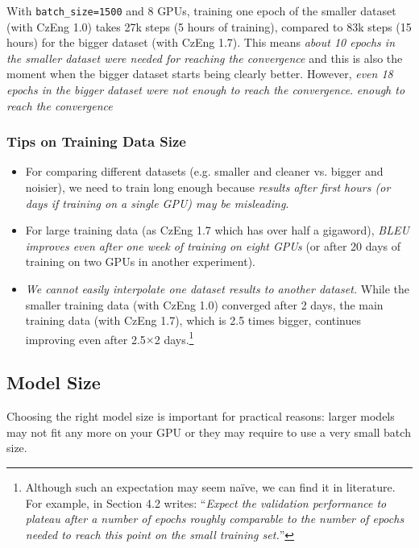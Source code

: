 \documentclass{pbmlarxiv} \pdfoutput=1
\def\recommend#1{\textsl{#1}}
\begin{document}
With \verb|batch_size=1500| and 8 GPUs,
 training one epoch of the smaller dataset (with CzEng 1.0) takes 27k steps (5 hours of training),
 compared to 83k steps (15 hours) for the bigger dataset (with CzEng 1.7).
This means \recommend{about 10 epochs in the smaller dataset were needed for reaching the convergence}
 and this is also the moment when the bigger dataset starts being clearly better.
However, \recommend{even 18 epochs in the bigger dataset were not enough to reach the convergence}.
\textit{enough to reach the convergence}

\subsubsection*{Tips on Training Data Size}
\begin{itemize}
  \item For comparing different datasets (e.g. smaller and cleaner vs. bigger and noisier),
    we need to train long enough because
    \recommend{results after first hours (or days if training on a single GPU) may be misleading}.
  \item For large training data (as CzEng 1.7 which has over half a gigaword),
   \recommend{BLEU improves even after one week of training on eight GPUs}
    (or after 20 days of training on two GPUs in another experiment).
  \item \recommend{We cannot easily interpolate one dataset results to another dataset.}
   While the smaller training data (with CzEng 1.0) converged after 2 days,
    the main training data (with CzEng 1.7), which is 2.5 times bigger,
    continues improving even after 2.5$\times$2 days.\footnote{
     Although such an expectation may seem na\"ive, we can find it in literature.
     For example, \citet{bottou-2012} in Section 4.2 writes:
     ``\emph{Expect the validation performance to plateau after a number of epochs roughly comparable
     to the number of epochs needed to reach this point on the small training set.}''
    }
\end{itemize}


\subsection{Model Size}
\label{sec:model-size}

Choosing the right model size is important for practical reasons:
 larger models may not fit any more on your GPU or they may require to use a very small batch size.
\end{document}
